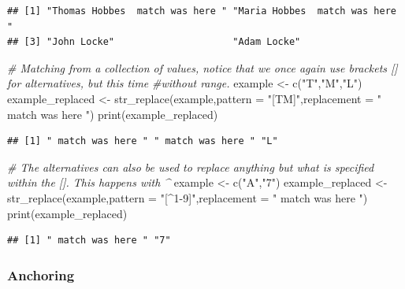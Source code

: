 \documentclass[
]{book}
\newenvironment{Shaded}{\begin{snugshade}}{\end{snugshade}}
\newcommand{\AttributeTok}[1]{\textcolor[rgb]{0.77,0.63,0.00}{#1}}
\newcommand{\CommentTok}[1]{\textcolor[rgb]{0.56,0.35,0.01}{\textit{#1}}}
\newcommand{\FunctionTok}[1]{\textcolor[rgb]{0.00,0.00,0.00}{#1}}
\newcommand{\NormalTok}[1]{#1}
\newcommand{\OtherTok}[1]{\textcolor[rgb]{0.56,0.35,0.01}{#1}}
\newcommand{\StringTok}[1]{\textcolor[rgb]{0.31,0.60,0.02}{#1}}
\begin{document}
\begin{verbatim}
## [1] "Thomas Hobbes  match was here " "Maria Hobbes  match was here " 
## [3] "John Locke"                     "Adam Locke"
\end{verbatim}

\begin{Shaded}
\begin{Highlighting}[]
\CommentTok{\# Matching from a collection of values, notice that we once again use brackets [] for alternatives, but this time}
\CommentTok{\#without range.}
\NormalTok{example }\OtherTok{\textless{}{-}} \FunctionTok{c}\NormalTok{(}\StringTok{"T"}\NormalTok{,}\StringTok{"M"}\NormalTok{,}\StringTok{"L"}\NormalTok{)}
\NormalTok{example\_replaced }\OtherTok{\textless{}{-}} \FunctionTok{str\_replace}\NormalTok{(example,}\AttributeTok{pattern =} \StringTok{"[TM]"}\NormalTok{,}\AttributeTok{replacement =} \StringTok{" match was here "}\NormalTok{)}
\FunctionTok{print}\NormalTok{(example\_replaced)}
\end{Highlighting}
\end{Shaded}

\begin{verbatim}
## [1] " match was here " " match was here " "L"
\end{verbatim}

\begin{Shaded}
\begin{Highlighting}[]
\CommentTok{\# The alternatives can also be used to replace anything but what is specified within the []. This happens with \^{}}
\NormalTok{example }\OtherTok{\textless{}{-}} \FunctionTok{c}\NormalTok{(}\StringTok{"A"}\NormalTok{,}\StringTok{"7"}\NormalTok{)}
\NormalTok{example\_replaced }\OtherTok{\textless{}{-}} \FunctionTok{str\_replace}\NormalTok{(example,}\AttributeTok{pattern =} \StringTok{"[\^{}1{-}9]"}\NormalTok{,}\AttributeTok{replacement =} \StringTok{" match was here "}\NormalTok{)}
\FunctionTok{print}\NormalTok{(example\_replaced)}
\end{Highlighting}
\end{Shaded}

\begin{verbatim}
## [1] " match was here " "7"
\end{verbatim}

\hypertarget{anchoring}{%
\subsubsection{Anchoring}\label{anchoring}}
\end{document}
